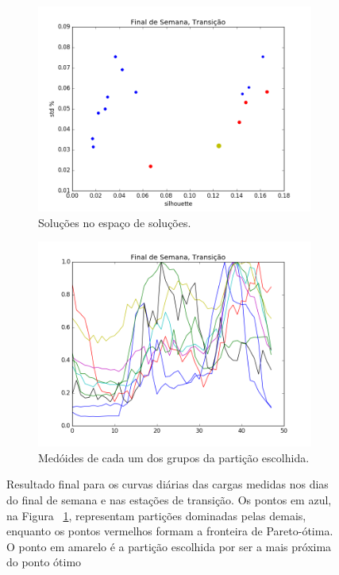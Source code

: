 \begin{figure}
	\centering
	\begin{subfigure}{.5\textwidth}
		\centering
		\includegraphics[width=.9\linewidth]{figuras/australia_5000/pareto_Final_de_Semana_Transicao.png}
		\caption{Soluções no espaço de soluções.}
		\label{fig:pareto_FDS_transicao}
	\end{subfigure}%
	\begin{subfigure}{.5\textwidth}
		\centering
		\includegraphics[width=.9\linewidth]{figuras/australia_5000/Final_de_Semana_Transicao.png}
		\caption{Medóides de cada um dos grupos da partição escolhida.}
		\label{fig:FDS_transicao}
	\end{subfigure}
	\caption{Resultado final para os curvas diárias das cargas medidas nos dias do final de semana e nas estações de transição. Os pontos em azul, na Figura ~\ref{fig:pareto_FDS_transicao}, representam partições dominadas pelas demais, enquanto os pontos vermelhos formam a fronteira de Pareto-ótima. O ponto em amarelo é a partição escolhida por ser a mais próxima do ponto ótimo}
	\label{fig:FDS_transicao_}
\end{figure}

